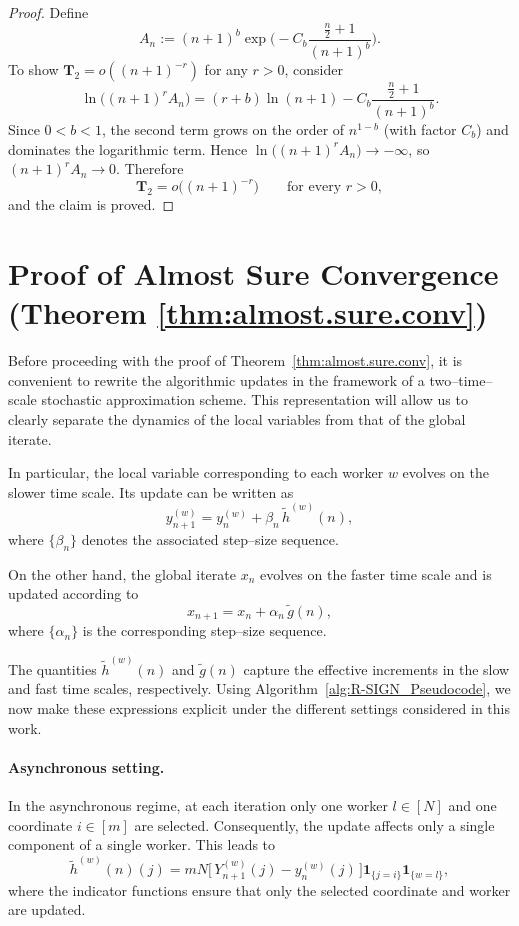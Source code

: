 \documentclass{article}
\begin{document}
\begin{proof}
Define
\[
A_n
:=
(n+1)^b
\exp\!\Big(-C_b\frac{\tfrac{n}{2}+1}{(n+1)^b}\Big).
\]
To show \(\mathbf{T}_2=o((n+1)^{-r})\) for any \(r>0\), consider
\[
\ln\!\big((n+1)^r A_n\big)
=(r+b)\ln(n+1)-C_b\frac{\tfrac{n}{2}+1}{(n+1)^b}.
\]
Since \(0<b<1\), the second term grows on the order of \(n^{1-b}\) (with factor
\(C_b\)) and dominates the logarithmic term. Hence
\(\ln\!\big((n+1)^r A_n\big)\to -\infty\), so
\((n+1)^r A_n\to 0\). Therefore
\[
\mathbf{T}_2 = o\!\big((n+1)^{-r}\big)\qquad\text{for every }r>0,
\]
and the claim is proved.

\end{proof}

\section{Proof of Almost Sure Convergence (Theorem \ref{thm:almost.sure.conv})}

Before proceeding with the proof of Theorem~\ref{thm:almost.sure.conv}, it is convenient to rewrite the algorithmic updates in the framework of a two--time--scale stochastic approximation scheme. This representation will allow us to clearly separate the dynamics of the local variables from that of the global iterate.

In particular, the local variable corresponding to each worker $w$ evolves on the slower time scale. Its update can be written as
\begin{equation}
y_{n+1}^{(w)} 
= y_n^{(w)} + \beta_n\,\widetilde{h}^{(w)}(n),
\label{eq:slow time scaleA}
\end{equation}
where $\{\beta_n\}$ denotes the associated step--size sequence.

On the other hand, the global iterate $x_n$ evolves on the faster time scale and is updated according to
\begin{equation}
x_{n+1} 
= x_n + \alpha_n\,\widetilde{g}(n),
\label{eq:fast time scaleB}
\end{equation}
where $\{\alpha_n\}$ is the corresponding step--size sequence.

The quantities $\widetilde{h}^{(w)}(n)$ and $\widetilde{g}(n)$ capture the effective increments in the slow and fast time scales, respectively. Using Algorithm~\ref{alg:R-SIGN_Pseudocode}, we now make these expressions explicit under the different settings considered in this work.

\paragraph{Asynchronous setting.}
In the asynchronous regime, at each iteration only one worker $l \in [N]$ and one coordinate $i \in [m]$ are selected. Consequently, the update affects only a single component of a single worker. This leads to
\begin{equation}
\widetilde{h}^{(w)}(n)(j)
= mN \bigl[\,Y_{n+1}^{(w)}(j) - y_n^{(w)}(j)\,\bigr]
\mathbf{1}_{\{j=i\}}
\mathbf{1}_{\{w=l\}},
\label{AFOhwnr}
\end{equation}
where the indicator functions ensure that only the selected coordinate and worker are updated.
\end{document}
